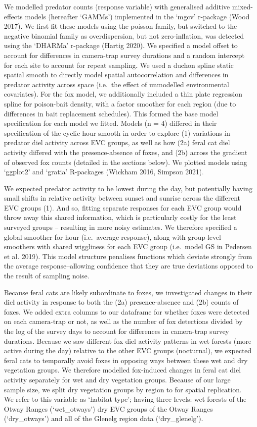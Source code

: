 \documentclass[]{elsarticle} %
\begin{document}
We modelled predator counts (response variable) with generalised additive mixed-effects models (hereafter `GAMMs') implemented in the `mgcv' r-package (Wood 2017). We first fit these models using the poisson family, but switched to the negative binomial family as overdispersion, but not zero-inflation, was detected using the `DHARMa' r-package (Hartig 2020). We specified a model offset to account for differences in camera-trap survey durations and a random intercept for each site to account for repeat sampling. We used a duchon spline static spatial smooth to directly model spatial autocorrelation and differences in predator activity across space (i.e.~the effect of unmodelled environmental covariates). For the fox model, we additionally included a thin plate regression spline for poison-bait density, with a factor smoother for each region (due to differences in bait replacement schedules). This formed the base model specification for each model we fitted. Models (n = 4) differed in their specification of the cyclic hour smooth in order to explore (1) variations in predator diel activity across EVC groups, as well as how (2a) feral cat diel activity differed with the presence-absence of foxes, and (2b) across the gradient of observed fox counts (detailed in the sections below). We plotted models using `ggplot2' and `gratia' R-packages (Wickham 2016, Simpson 2021).

We expected predator activity to be lowest during the day, but potentially having small shifts in relative activity between sunset and sunrise across the different EVC groups (1). And so, fitting separate responses for each EVC group would throw away this shared information, which is particularly costly for the least surveyed groups -- resulting in more noisy estimates. We therefore specified a global smoother for hour (i.e.~average response), along with group-level smoothers with shared wiggliness for each EVC group (i.e.~model GS in Pedersen et al. 2019). This model structure penalises functions which deviate strongly from the average response--allowing confidence that they are true deviations opposed to the result of sampling noise.

Because feral cats are likely subordinate to foxes, we investigated changes in their diel activity in response to both the (2a) presence-absence and (2b) counts of foxes. We added extra columns to our dataframe for whether foxes were detected on each camera-trap or not, as well as the number of fox detections divided by the log of the survey days to account for differences in camera-trap survey durations. Because we saw different fox diel activity patterns in wet forests (more active during the day) relative to the other EVC groups (nocturnal), we expected feral cats to temporally avoid foxes in opposing ways between these wet and dry vegetation groups. We therefore modelled fox-induced changes in feral cat diel activity separately for wet and dry vegetation groups. Because of our large sample size, we split dry vegetation groups by region to for spatial replication. We refer to this variable as `habitat type'; having three levels: wet forests of the Otway Ranges (`wet\_otways') dry EVC groups of the Otway Ranges (`dry\_otways') and all of the Glenelg region data (`dry\_glenelg').
\end{document}
